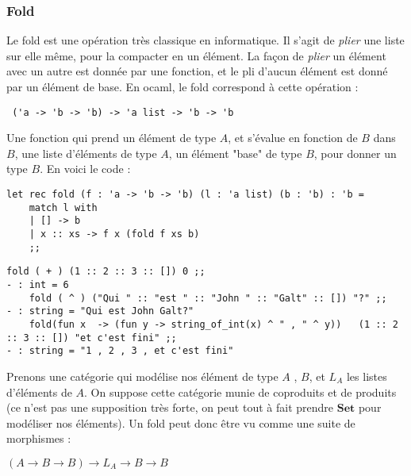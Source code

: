 \documentclass{article}
\begin{document}
\subsubsection{Fold}

Le fold est une opération très classique en informatique. Il s'agit de \textit{plier} une liste sur elle même, pour la compacter en un élément. La façon de \textit{plier} un élément avec un autre est donnée par une fonction, et le pli d'aucun élément est donné par un élément de base. En ocaml, le fold correspond à cette opération :

\begin{lstlisting}
 ('a -> 'b -> 'b) -> 'a list -> 'b -> 'b
\end{lstlisting}
 
Une fonction qui prend un élément de type $A$, et s'évalue en fonction de $B$ dans $B$, une liste d'éléments de type $A$,   un élément "base" de type $B$,  pour donner un type $B$. En voici le code :

\begin{verbatim}
let rec fold (f : 'a -> 'b -> 'b) (l : 'a list) (b : 'b) : 'b = 
    match l with 
    | [] -> b
    | x :: xs -> f x (fold f xs b)
    ;;       
\end{verbatim}


\begin{lstlisting}[languague=OCaml]
    fold ( + ) (1 :: 2 :: 3 :: []) 0 ;; 
- : int = 6 
    fold ( ^ ) ("Qui " :: "est " :: "John " :: "Galt" :: []) "?" ;; 
- : string = "Qui est John Galt?"
    fold(fun x  -> (fun y -> string_of_int(x) ^ " , " ^ y))   (1 :: 2 :: 3 :: []) "et c'est fini" ;; 
- : string = "1 , 2 , 3 , et c'est fini"
\end{lstlisting}

Prenons une catégorie qui modélise nos élément de type $A$ , $B$, et $L_A$ les listes d'éléments de $A$. On suppose cette catégorie munie de coproduits et de produits (ce n'est pas une supposition très forte, on peut tout à fait prendre $\mathbf{Set}$ pour modéliser nos éléments). Un fold peut donc être vu comme une suite de morphismes : 
\begin{center}
$ 
(A \rightarrow B \rightarrow B) \rightarrow L_A \rightarrow B \rightarrow B
$    
\end{center}
\end{document}
